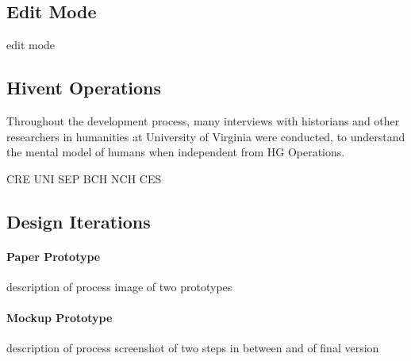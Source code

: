 
\subsection{Edit Mode} %
\label{sub:edit_mode}

edit mode


\subsection{Hivent Operations} %
\label{sub:hivent_operations}

Throughout the development process, many interviews with historians and other researchers in humanities at University of Virginia were conducted, to understand the mental model of humans when
independent from HG Operations.


CRE
UNI
SEP
BCH
NCH
CES



\subsection{Design Iterations} %
\label{sub:design_iterations}

\paragraph{Paper Prototype} %
\label{par:paper_prototype}

description of process
image of two prototypes


\paragraph{Mockup Prototype} %
\label{par:mockup_prototype}

description of process
screenshot of two steps in between and of final version

